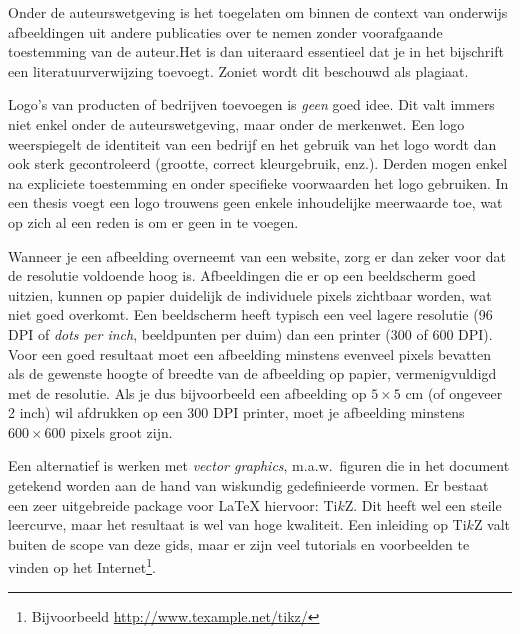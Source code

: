 
Onder de auteurswetgeving is het toegelaten om binnen de context van onderwijs afbeeldingen uit andere publicaties over te nemen zonder voorafgaande toestemming van de auteur.Het is dan uiteraard essentieel dat je in het bijschrift een literatuurverwijzing toevoegt. Zoniet wordt dit beschouwd als plagiaat.

Logo's van producten of bedrijven toevoegen is \emph{geen} goed idee. Dit valt immers niet enkel onder de auteurswetgeving, maar onder de merkenwet. Een logo weerspiegelt de identiteit van een bedrijf en het gebruik van het logo wordt dan ook sterk gecontroleerd (grootte, correct kleurgebruik, enz.). Derden mogen enkel na expliciete toestemming en onder specifieke voorwaarden het logo gebruiken. In een thesis voegt een logo trouwens geen enkele inhoudelijke meerwaarde toe, wat op zich al een reden is om er geen in te voegen.

Wanneer je een afbeelding overneemt van een website, zorg er dan zeker voor dat de resolutie voldoende hoog is. Afbeeldingen die er op een beeldscherm goed uitzien, kunnen op papier duidelijk de individuele pixels zichtbaar worden, wat niet goed overkomt. Een beeldscherm heeft typisch een veel lagere resolutie (96 DPI of \emph{dots per inch}, beeldpunten per duim) dan een printer (300 of 600 DPI). Voor een goed resultaat moet een afbeelding minstens evenveel pixels bevatten als de gewenste hoogte of breedte van de afbeelding op papier, vermenigvuldigd met de resolutie. Als je dus bijvoorbeeld een afbeelding op $5 \times 5$ cm (of ongeveer 2 inch) wil afdrukken op een 300 DPI printer, moet je afbeelding minstens $600 \times 600$ pixels groot zijn.

Een alternatief is werken met \emph{vector graphics}, m.a.w.~figuren die in het document getekend worden aan de hand van wiskundig gedefinieerde vormen. Er bestaat een zeer uitgebreide package voor {\LaTeX} hiervoor: Ti$k$Z. Dit heeft wel een steile leercurve, maar het resultaat is wel van hoge kwaliteit. Een inleiding op Ti$k$Z valt buiten de scope van deze gids, maar er zijn veel tutorials en voorbeelden te vinden op het Internet\footnote{Bijvoorbeeld \url{http://www.texample.net/tikz/}}.


%
